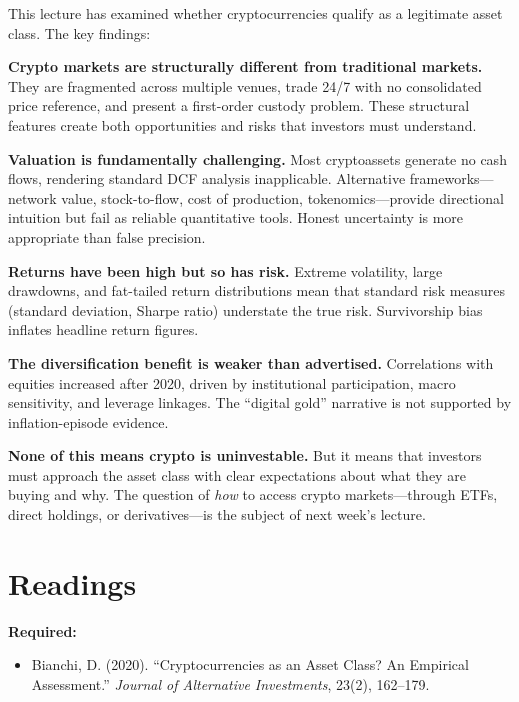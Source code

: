\documentclass[11pt,a4paper]{article}
\begin{document}
This lecture has examined whether cryptocurrencies qualify as a legitimate asset class. The key findings:

\textbf{Crypto markets are structurally different from traditional markets.} They are fragmented across multiple venues, trade 24/7 with no consolidated price reference, and present a first-order custody problem. These structural features create both opportunities and risks that investors must understand.

\textbf{Valuation is fundamentally challenging.} Most cryptoassets generate no cash flows, rendering standard DCF analysis inapplicable. Alternative frameworks---network value, stock-to-flow, cost of production, tokenomics---provide directional intuition but fail as reliable quantitative tools. Honest uncertainty is more appropriate than false precision.

\textbf{Returns have been high but so has risk.} Extreme volatility, large drawdowns, and fat-tailed return distributions mean that standard risk measures (standard deviation, Sharpe ratio) understate the true risk. Survivorship bias inflates headline return figures.

\textbf{The diversification benefit is weaker than advertised.} Correlations with equities increased after 2020, driven by institutional participation, macro sensitivity, and leverage linkages. The ``digital gold'' narrative is not supported by inflation-episode evidence.

\textbf{None of this means crypto is uninvestable.} But it means that investors must approach the asset class with clear expectations about what they are buying and why. The question of \textit{how} to access crypto markets---through ETFs, direct holdings, or derivatives---is the subject of next week's lecture.

\section*{Readings}

\textbf{Required:}
\begin{itemize}
    \item Bianchi, D. (2020). ``Cryptocurrencies as an Asset Class? An Empirical Assessment.'' \textit{Journal of Alternative Investments}, 23(2), 162--179.
\end{itemize}
\end{document}
